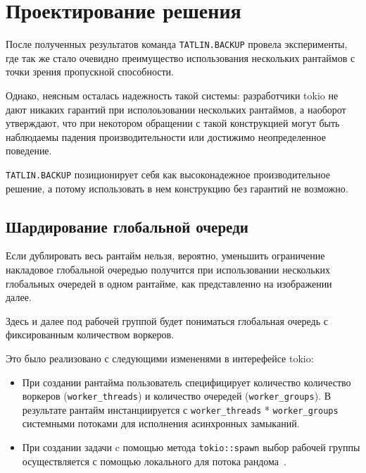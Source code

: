 
\section{Проектирование решения}

После полученных результатов команда \verb|TATLIN.BACKUP| провела эксперименты, где так же стало очевидно преимущество использования нескольких рантаймов с точки зрения пропускной способности.

Однако, неясным осталась надежность такой системы: разработчики tokio не дают никаких гарантий при исполоьзовании нескольких рантаймов, а наоборот утверждают, что при некотором обращении с такой конструкцией могут быть наблюдаемы падения производительности или достижимо неопределенное поведение.

\verb|TATLIN.BACKUP| позиционирует себя как высоконадежное производительное решение, а потому использовать в нем конструкцию без гарантий не возможно.

\subsection{Шардирование глобальной очереди}

Если дублировать весь рантайм нельзя, вероятно, уменьшить ограничение накладовое глобальной очередью получится при использовании нескольких глобальных очередей в одном рантайме, как представленно на изображении далее.


Здесь и далее под рабочей группой будет пониматься глобальная очередь с фиксированным количеством воркеров.

Это было реализовано с следующими измененями в интерефейсе tokio:

\begin{itemize}

\item При создании рантайма пользователь специфицирует количество количество воркеров (\verb|worker_threads|) и количество очередей (\verb|worker_groups|). В результате рантайм инстанциируется с \verb|worker_threads| * \verb|worker_groups| системными потоками для исполнения асинхронных замыканий.
\item При создании задачи c помощью метода \verb|tokio::spawn| выбор рабочей группы осуществляется с помощью локального для потока рандома~\cite{TODO}.
\end{itemize}

